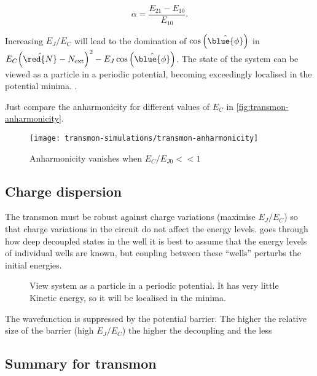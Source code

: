 \begin{equation}\label{eq:transmon-assymetry}
  \alpha = \frac{E_{21} - E_{10}}{E_{10}}.
\end{equation}

\noindent  Increasing   $E_J/E_C$  will   lead  to  the   domination  of
$\cos\left(\hat{\blue{\phi}}\right)$                                  in
$E_C{\left(\hat{\red{N}}-N_\text{ext}\right)^2}-
E_J\cos\left(\hat{\blue{\phi}}\right)$.  The state of  the system can be
viewed  as a  particle  in a  periodic  potential, becoming  exceedingly
localised in the potential minima.  .

\noindent Just compare  the anharmonicity for different  values of $E_C$
in \autoref{fig:transmon-anharmonicity}.

\begin{figure}[h]
  \centering
  \texttt{[image: transmon-simulations/transmon-anharmonicity]}
  \caption{\small          Anharmonicity          vanishes          when
    $E_{C}/E_{J0} << 1$\label{fig:transmon-anharmonicity}}
\end{figure}

\subsection{Charge dispersion}
\label{sec:charge-dispersion}

The  transmon  must  be   robust  against  charge  variations  (maximise
$E_J/E_C$) so  that charge variations in  the circuit do not  affect the
energy levels.    goes through  how deep decoupled
states  in the  well it  is best  to assume  that the  energy levels  of
individual  wells  are  known,  but  coupling  between  these  ``wells''
perturbs the initial energies.

\begin{figure}[h]
  \centering {}
  \caption{\small View system as a particle in a periodic potential.  It
    has  very little  Kinetic energy,  so it  will be  localised in  the
    minima.\label{fig:wavefunction_transmon}}
\end{figure}

The wavefunction is suppressed by the potential barrier.  The higher the
relative size of the barrier  (high $E_J/E_C$) the higher the decoupling
and the less

\subsection{Summary for transmon}
\label{sec:summary-transmon}

